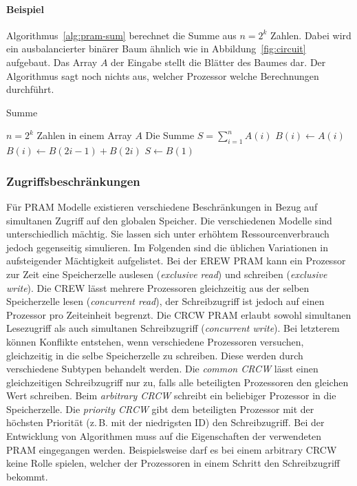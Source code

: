 \paragraph{Beispiel}
Algorithmus~\ref{alg:pram-sum} berechnet die Summe aus $n = 2^k$ Zahlen.
Dabei wird ein ausbalancierter binärer Baum ähnlich wie in
Abbildung~\ref{fig:circuit} aufgebaut.
Das Array $A$ der Eingabe stellt die Blätter des Baumes dar.
Der Algorithmus sagt noch nichts aus, welcher Prozessor welche Berechnungen
durchführt.

\begin{algorithm}
    \caption{Summe \cite[S.26]{jaja}}
    \label{alg:pram-sum}
    \begin{algorithmic}[1]
    \Require $n = 2^k$ Zahlen in einem Array $A$
    \Ensure Die Summe $S = \sum_{i=1}^n A(i)$
        \State $B(i) \gets A(i)$
    \EndParDo
            \State $B(i) \gets B(2i-1) + B(2i)$
        \EndParDo
    \EndFor
    \State $S \gets B(1)$
    \end{algorithmic}
\end{algorithm}

\subsubsection{Zugriffsbeschränkungen}
Für PRAM Modelle existieren verschiedene Beschränkungen in Bezug auf simultanen
Zugriff auf den globalen Speicher.
Die verschiedenen Modelle sind unterschiedlich mächtig. Sie lassen sich unter
erhöhtem Ressourcenverbrauch jedoch gegenseitig simulieren.
Im Folgenden sind die üblichen Variationen in aufsteigender Mächtigkeit
aufgelistet.
Bei der EREW PRAM kann ein Prozessor zur Zeit eine Speicherzelle auslesen
(\emph{exclusive read}) und schreiben (\emph{exclusive write}).
Die CREW lässt mehrere Prozessoren gleichzeitig aus der selben Speicherzelle
lesen (\emph{concurrent read}), der Schreibzugriff ist jedoch auf einen
Prozessor pro Zeiteinheit begrenzt.
Die CRCW PRAM erlaubt sowohl simultanen Lesezugriff als auch simultanen
Schreibzugriff (\emph{concurrent write}).
Bei letzterem können Konflikte entstehen, wenn verschiedene Prozessoren
versuchen, gleichzeitig in die selbe Speicherzelle zu schreiben.
Diese werden durch verschiedene Subtypen behandelt werden.
Die \emph{common CRCW} lässt einen gleichzeitigen Schreibzugriff nur zu, falls
alle beteiligten Prozessoren den gleichen Wert schreiben.
Beim \emph{arbitrary CRCW} schreibt ein beliebiger Prozessor in die
Speicherzelle.
Die \emph{priority CRCW} gibt dem beteiligten Prozessor mit der höchsten
Priorität (z.\,B. mit der niedrigsten ID) den Schreibzugriff.
Bei der Entwicklung von Algorithmen muss auf die Eigenschaften der verwendeten
PRAM eingegangen werden.
Beispielsweise darf es bei einem arbitrary CRCW keine Rolle spielen, welcher der
Prozessoren in einem Schritt den Schreibzugriff bekommt.
\cite[S.14f.]{jaja}
